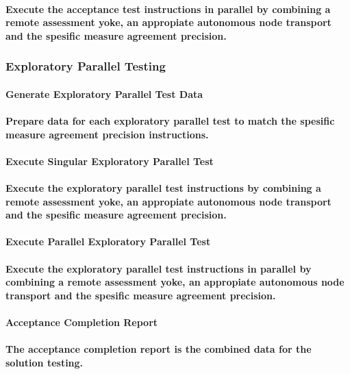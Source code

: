\documentclass{acm_proc_article-sp}
\begin{document}
\paragraph{Execute the acceptance test instructions in parallel by combining a remote assessment yoke, an appropiate autonomous node transport and the spesific measure agreement precision.}
\subsubsection{Exploratory Parallel Testing}
\paragraph{Generate Exploratory Parallel Test Data}
\paragraph{Prepare data for each exploratory parallel test to match the spesific measure agreement precision instructions.}
\paragraph{Execute Singular Exploratory Parallel Test}
\paragraph{Execute the exploratory parallel test instructions by combining a remote assessment yoke, an appropiate autonomous node transport and the spesific measure agreement precision.}
\paragraph{Execute Parallel Exploratory Parallel Test}
\paragraph{Execute the exploratory parallel test instructions in parallel by combining a remote assessment yoke, an appropiate autonomous node transport and the spesific measure agreement precision.}
\paragraph{Acceptance Completion Report}
\paragraph{The acceptance completion report is the combined data for the solution testing.}
\newpage
\end{document}

